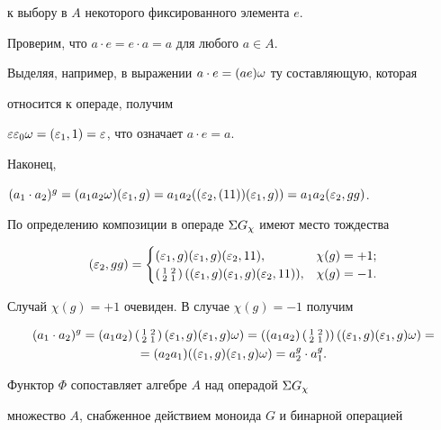\begin{pf}
к выбору в $A$ некоторого фиксированного элемента $e$.


Проверим, что $ a\cdot e=e \cdot a=a$ для любого $a \in A$.


Выделяя, например, в выражении $a\cdot e=(ae)\omega$ ту составляющую, которая


относится к операде, получим


$\varepsilon\varepsilon_0\omega=(\varepsilon_1,1)=\varepsilon$, что означает $a\cdot e=a$.


Наконец,


$(a_1 \cdot a_2)^g=(a_1a_2\o)(\ep_1,g)=a_1a_2((\ep_2,(11))(\ep_1,g))=


a_1a_2(\ep_2,gg)$.





По определению композиции в операде $\Sigma G_{\chi}$ имеют место тождества


$$


(\ep_2,gg)=


\begin{cases}


(\ep_1,g)(\ep_1,g)(\ep_2,11), & \chi(g)=+1; \\


\mymat{ 1 & 2 \\ 2 & 1 }


((\ep_1,g)(\ep_1,g)(\ep_2,11)), & \chi(g)=-1.


\end{cases}


$$


Случай $\chi(g)=+1$ очевиден. В случае $\chi(g)=-1$ получим


\begin{gather*}


(a_1 \cdot a_2)^g=(a_1a_2)


\mymat{ 1 & 2 \\ 2 & 1}(\ep_1,g)(\ep_1,g)\o)=


\left((a_1a_2)\mymat{1 & 2 \\ 2 & 1}\right)((\ep_1,g)(\ep_1,g)\o)=\\


=(a_2a_1)((\ep_1,g)(\ep_1,g)\o)=a_2^g \cdot a_1^g.


\end{gather*}





Функтор $\Phi$ сопоставляет алгебре $A$ над операдой $\Sigma G_{\chi}$


множество $A$, снабженное действием моноида $G$ и бинарной операцией



\end{pf}
